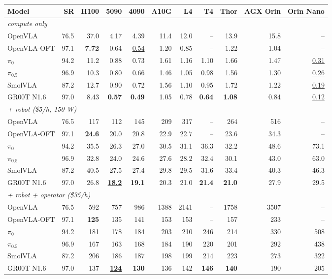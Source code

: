 \begin{tabular}{l r rrrrrrrrr}
\toprule
Model & SR & H100 & 5090 & 4090 & A10G & L4 & T4 & Thor & AGX Orin & Orin Nano \\
\midrule
\multicolumn{11}{l}{\emph{compute only}} \\
OpenVLA & 76.5 & 37.0 & 4.17 & 4.39 & 11.4 & 12.0 & -- & 13.9 & 15.8 & -- \\
OpenVLA-OFT & 97.1 & \textbf{7.72} & 0.64 & \underline{0.54} & 1.20 & 0.85 & -- & 1.22 & 1.04 & -- \\
$\pi_0$ & 94.2 & 11.2 & 0.88 & 0.73 & 1.61 & 1.16 & 1.10 & 1.66 & 1.47 & \underline{0.31} \\
$\pi_{0.5}$ & 96.9 & 10.3 & 0.80 & 0.66 & 1.46 & 1.05 & 0.98 & 1.56 & 1.30 & \underline{0.26} \\
SmolVLA & 87.2 & 12.7 & 0.90 & 0.72 & 1.56 & 1.10 & 0.95 & 1.72 & 1.22 & \underline{0.19} \\
GR00T N1.6 & 97.0 & 8.43 & \textbf{0.57} & \textbf{0.49} & 1.05 & 0.78 & \textbf{0.64} & \textbf{1.08} & 0.84 & \underline{0.12} \\
\midrule
\multicolumn{11}{l}{\emph{+ robot (\$5/h, 150 W)}} \\
OpenVLA & 76.5 & 117 & 112 & 145 & 209 & 317 & -- & 264 & 516 & -- \\
OpenVLA-OFT & 97.1 & \textbf{24.6} & 20.0 & 20.8 & 22.9 & 22.7 & -- & 23.6 & 34.3 & -- \\
$\pi_0$ & 94.2 & 35.5 & 26.3 & 27.0 & 30.5 & 31.1 & 36.3 & 32.2 & 48.6 & 73.1 \\
$\pi_{0.5}$ & 96.9 & 32.8 & 24.0 & 24.6 & 27.6 & 28.2 & 32.4 & 30.1 & 43.0 & 63.0 \\
SmolVLA & 87.2 & 40.5 & 27.5 & 27.4 & 29.8 & 29.5 & 31.6 & 33.4 & 40.3 & 46.3 \\
GR00T N1.6 & 97.0 & 26.8 & \underline{\textbf{18.2}} & \textbf{19.1} & 20.3 & 21.0 & \textbf{21.4} & \textbf{21.0} & 27.9 & 29.5 \\
\midrule
\multicolumn{11}{l}{\emph{+ robot + operator (\$35/h)}} \\
OpenVLA & 76.5 & 592 & 757 & 986 & 1388 & 2141 & -- & 1758 & 3507 & -- \\
OpenVLA-OFT & 97.1 & \textbf{125} & 135 & 141 & 153 & 153 & -- & 157 & 233 & -- \\
$\pi_0$ & 94.2 & 181 & 178 & 184 & 203 & 210 & 246 & 214 & 330 & 508 \\
$\pi_{0.5}$ & 96.9 & 167 & 163 & 168 & 184 & 190 & 220 & 201 & 292 & 438 \\
SmolVLA & 87.2 & 206 & 186 & 187 & 198 & 199 & 214 & 223 & 273 & 322 \\
GR00T N1.6 & 97.0 & 137 & \underline{\textbf{124}} & \textbf{130} & 136 & 142 & \textbf{146} & \textbf{140} & 190 & 205 \\
\bottomrule
\end{tabular}
